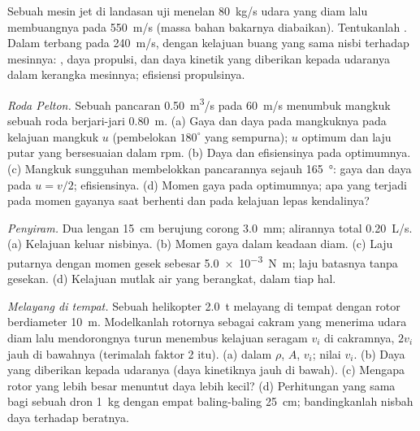 \begin{exercise}[$\star$]\label{exo:b2:flow-balances:4}
Sebuah mesin jet di landasan uji menelan \qty{80}{kg/s} udara yang diam lalu
membuangnya pada \qty{550}{m/s} (massa bahan bakarnya diabaikan). Tentukanlah . Dalam terbang
pada \qty{240}{m/s}, dengan kelajuan buang yang sama nisbi terhadap mesinnya: ,
daya propulsi, dan daya kinetik yang diberikan kepada udaranya dalam kerangka
mesinnya; efisiensi propulsinya.
\end{exercise}

\begin{exercise}[$\star\star$]\label{exo:b2:flow-balances:5}
\emph{Roda Pelton.} Sebuah pancaran \qty{0.50}{m^3/s} pada \qty{60}{m/s} menumbuk
mangkuk sebuah roda berjari-jari \qty{0.80}{m}. (a) Gaya dan daya pada
mangkuknya pada kelajuan mangkuk $u$ (pembelokan $180^\circ$ yang sempurna); $u$ optimum
dan laju putar yang bersesuaian dalam rpm. (b) Daya dan efisiensinya
pada optimumnya. (c) Mangkuk sungguhan membelokkan pancarannya sejauh \qty{165}{\degree}:
gaya dan daya pada $u = v/2$; efisiensinya. (d) Momen gaya pada optimumnya;
apa yang terjadi pada momen gayanya saat berhenti dan pada kelajuan lepas kendalinya?
\end{exercise}

\begin{exercise}[$\star\star$]\label{exo:b2:flow-balances:6}
\emph{Penyiram.} Dua lengan \qty{15}{cm} berujung corong \qty{3.0}{mm};
alirannya total \qty{0.20}{L/s}. (a) Kelajuan keluar nisbinya. (b) Momen gaya dalam
keadaan diam. (c) Laju putarnya dengan momen gesek  sebesar
\qty{5.0e-3}{N.m}; laju batasnya tanpa gesekan. (d) Kelajuan mutlak
air yang berangkat, dalam tiap hal.
\end{exercise}

\begin{exercise}[$\star\star$]\label{exo:b2:flow-balances:7}
\emph{Melayang di tempat.} Sebuah helikopter \qty{2.0}{t} melayang di tempat dengan rotor
berdiameter \qty{10}{m}. Modelkanlah rotornya sebagai cakram yang menerima udara diam
lalu mendorongnya turun menembus kelajuan seragam $v_i$ di cakramnya, $2v_i$ jauh
di bawahnya (terimalah faktor 2 itu). (a)  dalam $\rho$, $A$, $v_i$;
nilai $v_i$. (b) Daya yang diberikan kepada udaranya (daya kinetiknya jauh
di bawah). (c) Mengapa rotor yang lebih besar menuntut daya lebih kecil? (d) Perhitungan
yang sama bagi sebuah dron \qty{1}{kg} dengan empat baling-baling \qty{25}{cm};
bandingkanlah nisbah daya terhadap beratnya.
\end{exercise}

